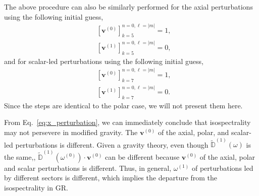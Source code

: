 \documentclass[aps,prx,amsmath,floats,floatfix,twocolumn,
  superscriptaddress,nofootinbib,showpacs]{revtex4-1}
\begin{document}
The above procedure can also be similarly performed for the axial perturbations using the following initial guess, 
\begin{equation}
\begin{split}
&\left[ \textbf{v}^{(0)}\right]_{k=5}^{n=0,\ell=|m|} = 1, \\
&\left[ \textbf{v}^{(1)}\right]_{k=5}^{n=0,\ell=|m|} = 0, 
\end{split}
\end{equation}
and for scalar-led perturbations using the following initial guess, 
\begin{equation}
\begin{split}
&\left[ \textbf{v}^{(0)}\right]_{k=7}^{n=0,\ell=|m|} = 1, \\
&\left[ \textbf{v}^{(1)}\right]_{k=7}^{n=0,\ell=|m|} = 0. 
\end{split}
\end{equation}
Since the steps are identical to the polar case, we will not present them here. 

From Eq.~\eqref{eq:x_perturbation}, we can immediately conclude that isospectrality may not persevere in modified gravity. 
The $\textbf{v}^{(0)}$ of the axial, polar, and scalar-led perturbations is different. 
Given a gravity theory, even though $\tilde{\mathbb{D}}^{(1)}(\omega)$ is the same,,
$\tilde{\mathbb{D}}^{(1)} (\omega^{(0)}) \cdot \textbf{v}^{(0)}$ can be different because $\textbf{v}^{(0)}$ of the axial, polar and scalar perturbations is different. 
Thus, in general, $\omega^{(1)}$ of perturbations led by different sectors is different, which implies the departure from the isospectrality in GR. 
\end{document}
